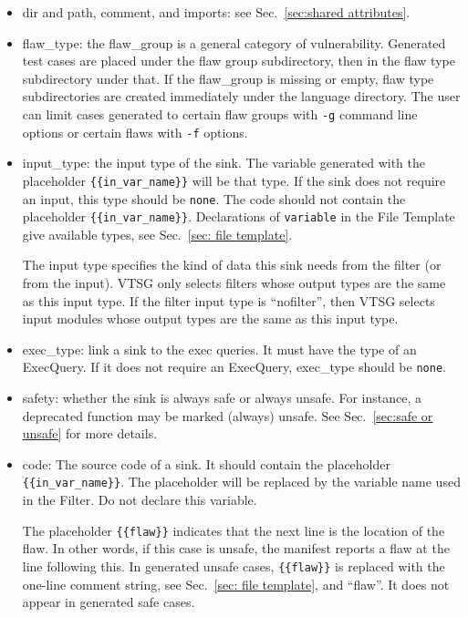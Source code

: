 \begin{itemize}
    \item dir and path, comment, and imports: see Sec.~\ref{sec:shared attributes}.

    \item flaw\_type: the flaw\_group is a general category of vulnerability.
    Generated test cases are placed under the flaw group subdirectory, then
    in the flaw type subdirectory under that.  If the flaw\_group is missing or
    empty, flaw type subdirectories are created immediately under the language
    directory.
    The user can limit
    cases generated to certain flaw groups with \verb|-g| command
    line options or certain flaws with \verb|-f| options.
    
    \item input\_type: the input type of the sink. The variable
    generated with the placeholder \verb|{{in_var_name}}| will be 
    that type.  If the sink does not
    require an input, this type should be \verb|none|. The code 
    should not contain
    the placeholder \verb|{{in_var_name}}|.
    Declarations of \verb|variable| in the File Template give
    available types, see Sec.~\ref{sec: file template}.

    The input type specifies the kind of data this sink needs from the filter (or
    from the input).  VTSG only selects filters whose output types are the same as
    this input type.  If the filter input type is ``nofilter'',
    then VTSG selects input modules whose
    output types are the same as this input type.

    \item exec\_type: link a sink to the exec queries.  It must have 
    the type of
    an ExecQuery. If it does not require an ExecQuery, 
    exec\_type should be \verb|none|.

    \item safety: whether the sink is always safe or always unsafe.  For instance, a
      deprecated function may be marked (always) unsafe.
      See Sec.~\ref{sec:safe or unsafe}
      for more details.
    
    \item code: The source code of a sink. It should contain the placeholder
    \verb|{{in_var_name}}|.  The placeholder will be replaced by the variable
    name used in the Filter.  Do not declare this variable.

    The placeholder \verb|{{flaw}}| indicates that the next line is the location
    of the flaw.  In other words, if this case is unsafe, the manifest reports a
    flaw at the line following this.  In generated unsafe cases,
    \verb|{{flaw}}| is replaced with the one-line comment string,
    see Sec.~\ref{sec: file template}, and ``flaw''.
    It does not appear in generated safe cases.
\end{itemize}

